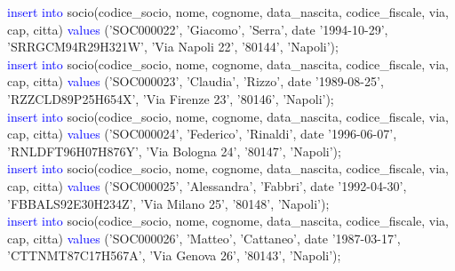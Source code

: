 \documentclass{article}
\begin{document}
\begin{flushleft}
{        \hspace*{0.5em}\textcolor{blue}{insert into} socio(codice\_socio, nome, cognome, data\_nascita, codice\_fiscale, via, \hspace*{0.5em}cap, citta) \textcolor{blue}{values} ('SOC000022', 'Giacomo', 'Serra', date '1994-10-29', \hspace*{0.4em}'SRRGCM94R29H321W', 'Via Napoli 22', '80144', 'Napoli'); \\
        \vspace{2mm}
        \hspace*{0.5em}\textcolor{blue}{insert into} socio(codice\_socio, nome, cognome, data\_nascita, codice\_fiscale, via, \hspace*{0.5em}cap, citta) \textcolor{blue}{values} ('SOC000023', 'Claudia', 'Rizzo', date '1989-08-25', \hspace*{0.4em}'RZZCLD89P25H654X', 'Via Firenze 23', '80146', 'Napoli'); \\
        \vspace{2mm}
        \hspace*{0.5em}\textcolor{blue}{insert into} socio(codice\_socio, nome, cognome, data\_nascita, codice\_fiscale, via, \hspace*{0.5em}cap, citta) \textcolor{blue}{values} ('SOC000024', 'Federico', 'Rinaldi', date '1996-06-07', \hspace*{0.4em}'RNLDFT96H07H876Y', 'Via Bologna 24', '80147', 'Napoli'); \\
        \vspace{2mm}
        \hspace*{0.5em}\textcolor{blue}{insert into} socio(codice\_socio, nome, cognome, data\_nascita, codice\_fiscale, via, \hspace*{0.5em}cap, citta) \textcolor{blue}{values} ('SOC000025', 'Alessandra', 'Fabbri', date '1992-04-30', \hspace*{0.4em}'FBBALS92E30H234Z', 'Via Milano 25', '80148', 'Napoli'); \\
        \vspace{2mm}
        \hspace*{0.5em}\textcolor{blue}{insert into} socio(codice\_socio, nome, cognome, data\_nascita, codice\_fiscale, via, \hspace*{0.5em}cap, citta) \textcolor{blue}{values} ('SOC000026', 'Matteo', 'Cattaneo', date '1987-03-17', \hspace*{0.4em}'CTTNMT87C17H567A', 'Via Genova 26', '80143', 'Napoli'); \\
        \vspace{2mm}
}
\end{flushleft}
\end{document}
